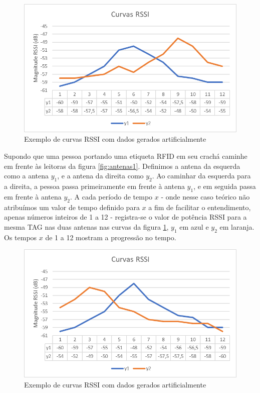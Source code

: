\begin{figure}[H]
    \centering
    \includegraphics[width=0.8\linewidth]{figs/Metodologia/image001.png}
    \caption{Exemplo de curvas RSSI com dados gerados artificialmente}
    \label{fig:rssicurvesmet1}
\end{figure}


 Supondo que uma pessoa portando uma etiqueta RFID em seu crachá caminhe em frente às leitoras da figura \ref{fig:antenas1}. Definimos a antena da esquerda como a antena $y_1$, e a antena da direita como $y_2$. Ao caminhar da esquerda para a direita, a pessoa passa primeiramente em frente à antena $y_1$, e em seguida passa em frente à antena $y_2$. A cada período de tempo $x$ - onde nesse caso teórico não atribuímos um valor de tempo definido para $x$ a fim de facilitar o entendimento, apenas números inteiros de 1 a 12 - registra-se o valor de potência RSSI para a mesma TAG nas duas antenas nas curvas da figura \ref{fig:rssicurvesmet1}, $y_1$ em azul e $y_2$ em laranja. Os tempos $x$ de 1 a 12 mostram a progressão no tempo.
 
 \begin{figure}[H]
    \centering
    \includegraphics[width=0.8\linewidth]{figs/Metodologia/image005.png}
    \caption{Exemplo de curvas RSSI com dados gerados artificialmente}
    \label{fig:rssicurvesmet2}
\end{figure}
 
